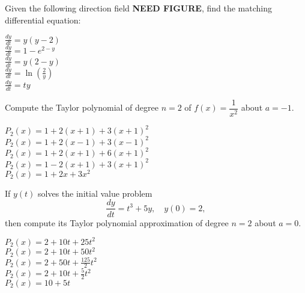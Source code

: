 \documentclass[12pt]{amsart}
\def\ds{\displaystyle}
\begin{document}
\begin{exam}
\begin{problem}
Given the following direction field \textbf{NEED FIGURE}, find the matching
differential equation:
% 
 \begin{answers}{1}
$\frac{dy}{dt}=y(y-2)$ \\
$\frac{dy}{dt}=1-e^{2-y}$ \\
$\frac{dy}{dt}=y(2-y)$ \\
$\frac{dy}{dt}=\ln(\frac 2y)$ \\
$\frac{dy}{dt}=ty$ \\
\end{answers}
\end{problem}


\begin{problem}
Compute the Taylor polynomial of degree $n=2$ of
$\ds f(x)=\dfrac{1}{x^2}$ about
$a=-1$.

\begin{answers}{1}
$ P_2(x)=1+2(x+1)+3(x+1)^2$\\
$ P_2(x)=1+2(x-1)+3(x-1)^2$ \\
$ P_2(x)=1+2(x+1)+6(x+1)^2$ \\
$ P_2(x)=1-2(x+1)+3(x+1)^2$\\
$ P_2(x)=1+2x+3x^2$\\
\end{answers}
\end{problem}



\begin{problem}
If $y(t)$ solves the initial value problem
$$
\frac{dy}{dt}=t^3+5y,\quad y(0)=2,
$$
then compute its Taylor polynomial approximation of degree $n=2$ 
about $a=0$.
%
\begin{answers}{1}
$P_2(x)=2+10t+25t^2$ \\
$ P_2(x)=2+10t+50t^2$ \\
$ P_2(x)=2+50t+\frac{125}{2}t^2$ \\
$ P_2(x)=2+10t+\frac{5}{2}t^2$ \\
$ P_2(x)=10+5t$\\
\end{answers}
\end{problem}






\end{exam}
\end{document}

